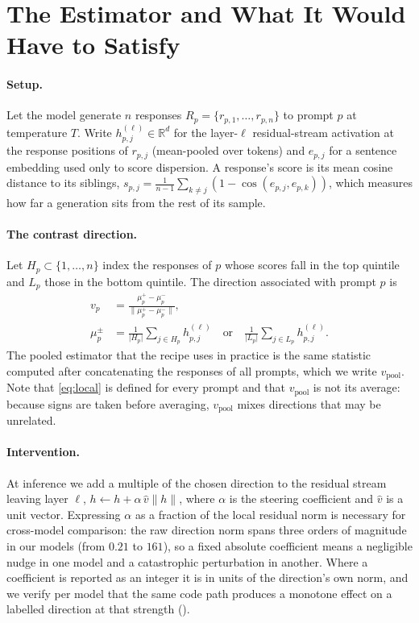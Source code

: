 \section{The Estimator and What It Would Have to Satisfy}
\label{sec:method}

\paragraph{Setup.}
Let the model generate $n$ responses $R_p = \{r_{p,1},\dots,r_{p,n}\}$ to prompt $p$ at temperature
$T$. Write $h_{p,j}^{(\ell)} \in \mathbb{R}^{d}$ for the layer-$\ell$ residual-stream activation at
the response positions of $r_{p,j}$ (mean-pooled over tokens) and $e_{p,j}$ for a sentence embedding
used only to score dispersion. A response's score is its mean cosine distance to its siblings,
$s_{p,j} = \frac{1}{n-1}\sum_{k \neq j} (1 - \cos(e_{p,j}, e_{p,k}))$, which measures how far a
generation sits from the rest of its sample.

\paragraph{The contrast direction.}
Let $H_p \subset \{1,\dots,n\}$ index the responses of $p$ whose scores fall in the top quintile and
$L_p$ those in the bottom quintile. The direction associated with prompt $p$ is
\begin{equation}
\label{eq:local}
\begin{split}
v_p &= \frac{\mu_p^{+} - \mu_p^{-}}{\lVert \mu_p^{+} - \mu_p^{-}\rVert},\\
\mu_p^{\pm} &= \frac{1}{\lvert H_p \rvert}\sum_{j \in H_p} h_{p,j}^{(\ell)}
\quad\text{or}\quad
\frac{1}{\lvert L_p \rvert}\sum_{j \in L_p} h_{p,j}^{(\ell)} .
\end{split}
\end{equation}
The pooled estimator that the recipe uses in practice is the same statistic computed after
concatenating the responses of all prompts, which we write $v_{\text{pool}}$. Note that
\eqref{eq:local} is defined for every prompt and that $v_{\text{pool}}$ is not its average: because
signs are taken before averaging, $v_{\text{pool}}$ mixes directions that may be unrelated.

\paragraph{Intervention.}
At inference we add a multiple of the chosen direction to the residual stream leaving layer $\ell$,
$h \leftarrow h + \alpha\, \hat{v} \lVert h \rVert$, where $\alpha$ is the steering coefficient and
$\hat{v}$ is a unit vector. Expressing $\alpha$ as a fraction of the local residual norm is
necessary for cross-model comparison: the raw direction norm spans three orders of magnitude in
our models (from $0.21$ to $161$), so a fixed absolute coefficient means a negligible nudge in one
model and a catastrophic perturbation in another. Where a coefficient is reported as an integer it
is in units of the direction's own norm, and we verify per model that the same code path produces a
monotone effect on a labelled direction at that strength ().

